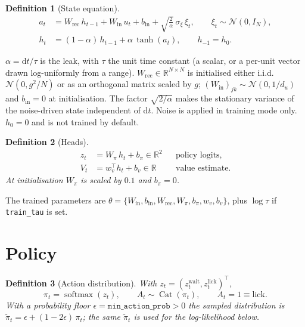 \documentclass[11pt]{article}
\newtheorem{definition}{Definition}
\newcommand{\R}{\mathbb{R}}
\newcommand{\softmax}{\operatorname{softmax}}
\newcommand{\1}{\mathbf{1}}
\DeclareMathOperator{\Cat}{Cat}
\begin{document}
\begin{definition}[State equation]
\begin{align}
  a_t &= W_{\mathrm{rec}}\, h_{t-1} + W_{\mathrm{in}}\, u_t + b_{\mathrm{in}}
    + \sqrt{\tfrac{2}{\alpha}}\,\sigma_{\!\xi}\,\xi_t,
    \qquad \xi_t \sim \mathcal{N}(0, I_N), \label{eq:pre}\\[2pt]
  h_t &= (1-\alpha)\, h_{t-1} + \alpha\, \tanh(a_t),
    \qquad h_{-1} = h_0. \label{eq:state}
\end{align}
\end{definition}

\noindent
$\alpha = \mathrm{d}t/\tau$ is the leak, with $\tau$ the unit time constant (a scalar, or
a per-unit vector drawn log-uniformly from a range). $W_{\mathrm{rec}} \in \R^{N\times N}$
is initialised either i.i.d.\ $\mathcal{N}(0, g^2/N)$ or as an orthogonal matrix scaled
by $g$; $(W_{\mathrm{in}})_{jk}\sim\mathcal{N}(0,1/d_u)$ and $b_{\mathrm{in}} = 0$ at
initialisation. The factor $\sqrt{2/\alpha}$ makes the stationary variance of the
noise-driven state independent of $\mathrm{d}t$. Noise is applied in training mode only.
$h_0 = 0$ and is not trained by default.

\begin{definition}[Heads]
\begin{align}
  z_t &= W_{\pi}\, h_t + b_{\pi} \in \R^{2} && \text{policy logits}, \label{eq:logits}\\
  V_t &= w_v^{\top} h_t + b_v \in \R && \text{value estimate}. \label{eq:value}
\end{align}
At initialisation $W_\pi$ is scaled by $0.1$ and $b_\pi = 0$.
\end{definition}

The trained parameters are
$\theta = \{ W_{\mathrm{in}}, b_{\mathrm{in}}, W_{\mathrm{rec}}, W_{\pi}, b_{\pi}, w_v, b_v \}$,
plus $\log\tau$ if \texttt{train\_tau} is set.

\section{Policy}\label{sec:policy}

\begin{definition}[Action distribution]
With $z_t = (z_t^{\mathrm{wait}}, z_t^{\mathrm{lick}})^{\!\top}$,
\begin{equation}
  \pi_t = \softmax(z_t), \qquad A_t \sim \Cat(\pi_t), \qquad A_t = 1 \equiv \text{lick}.
\end{equation}
With a probability floor $\epsilon = \texttt{min\_action\_prob} > 0$ the sampled
distribution is $\tilde\pi_t = \epsilon + (1 - 2\epsilon)\,\pi_t$; the same $\tilde\pi_t$
is used for the log-likelihood below.
\end{definition}
\end{document}
